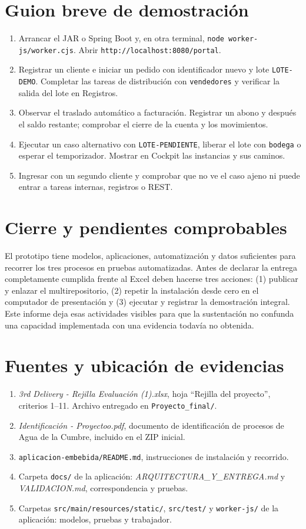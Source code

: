 \documentclass[11pt,letterpaper]{article}
\newcommand{\ruta}[1]{\nolinkurl{#1}}
\begin{document}
\clearpage
\section*{Guion breve de demostración}
\begin{enumerate}
\item Arrancar el JAR o Spring Boot y, en otra terminal, \texttt{node worker-js/worker.cjs}. Abrir \ruta{http://localhost:8080/portal}.
\item Registrar un cliente e iniciar un pedido con identificador nuevo y lote \ruta{LOTE-DEMO}. Completar las tareas de distribución con \ruta{vendedores} y verificar la salida del lote en Registros.
\item Observar el traslado automático a facturación. Registrar un abono y después el saldo restante; comprobar el cierre de la cuenta y los movimientos.
\item Ejecutar un caso alternativo con \ruta{LOTE-PENDIENTE}, liberar el lote con \ruta{bodega} o esperar el temporizador. Mostrar en Cockpit las instancias y sus caminos.
\item Ingresar con un segundo cliente y comprobar que no ve el caso ajeno ni puede entrar a tareas internas, registros o REST.
\end{enumerate}

\section*{Cierre y pendientes comprobables}
El prototipo tiene modelos, aplicaciones, automatización y datos suficientes para recorrer los tres procesos en pruebas automatizadas. Antes de declarar la entrega completamente cumplida frente al Excel deben hacerse tres acciones: (1) publicar y enlazar el multirepositorio, (2) repetir la instalación desde cero en el computador de presentación y (3) ejecutar y registrar la demostración integral. Este informe deja esas actividades visibles para que la sustentación no confunda una capacidad implementada con una evidencia todavía no obtenida.

\section*{Fuentes y ubicación de evidencias}
\begin{enumerate}
\item \emph{3rd Delivery - Rejilla Evaluación (1).xlsx}, hoja ``Rejilla del proyecto'', criterios 1--11. Archivo entregado en \ruta{Proyecto_final/}.
\item \emph{Identificación - Proyectoo.pdf}, documento de identificación de procesos de Agua de la Cumbre, incluido en el ZIP inicial.
\item \ruta{aplicacion-embebida/README.md}, instrucciones de instalación y recorrido.
\item Carpeta \ruta{docs/} de la aplicación: \emph{ARQUITECTURA\_Y\_ENTREGA.md} y \emph{VALIDACION.md}, correspondencia y pruebas.
\item Carpetas \ruta{src/main/resources/static/}, \ruta{src/test/} y \ruta{worker-js/} de la aplicación: modelos, pruebas y trabajador.
\end{enumerate}
\end{document}
